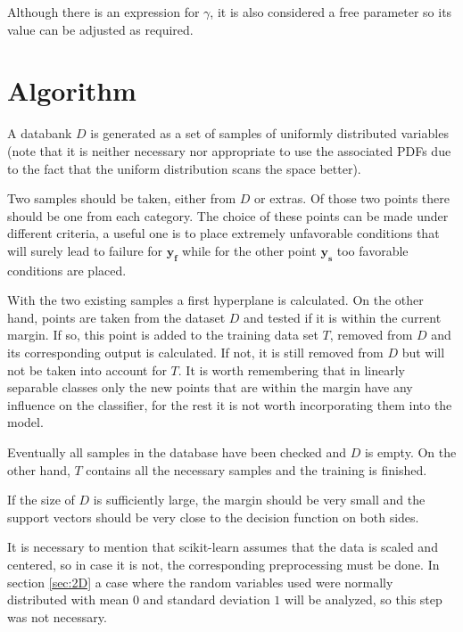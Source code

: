 Although there is an expression for \(\gamma\), it is also considered a free parameter so its value can be adjusted as required.

\section{Algorithm \cite{Hurtado2003}} \label{sec:algorithm}

A databank \(D\) is generated as a set of samples of uniformly distributed variables (note that it is neither necessary nor appropriate to use the associated \ac{PDF}s  due to the fact that the uniform distribution scans the space better).

Two samples should be taken, either from \(D\) or extras. Of those two points there should be one from each category. The choice of these points can be made under different criteria, a useful one is to place extremely unfavorable conditions that will surely lead to failure for \(\mathbf{y_f}\) while for the other point \(\mathbf{y_s}\) too favorable conditions are placed.

With the two existing samples a first hyperplane is calculated. On the other hand, points are taken from the dataset \(D\) and tested if it is within the current margin. If so, this point is added to the training data set \(T\), removed from \(D\) and its corresponding output is calculated. If not, it is still removed from \(D\) but will not be taken into account for \(T\). It is worth remembering that in linearly separable classes only the new points that are within the margin have any influence on the classifier, for the rest it is not worth incorporating them into the model.

Eventually all samples in the database have been checked and \(D\) is empty. On the other hand, \(T\) contains all the necessary samples and the training is finished.

If the size of \(D\) is sufficiently large, the margin should be very small and the support vectors should be very close to the decision function on both sides.

It is necessary to mention that scikit-learn assumes that the data is scaled and centered, so in case it is not, the corresponding preprocessing must be done. In section \ref{sec:2D} a case where the random variables used were normally distributed with mean \(0\) and standard deviation \(1\) will be analyzed, so this step was not necessary.

